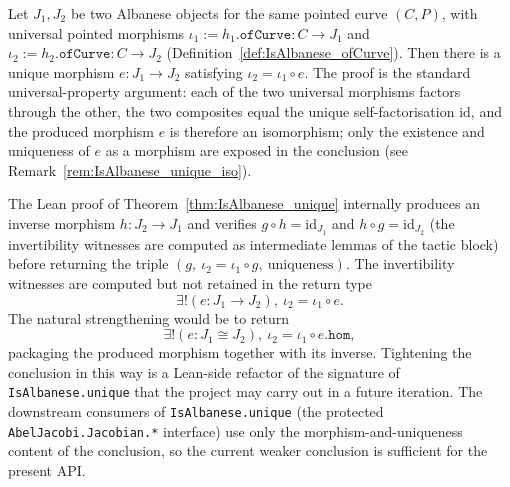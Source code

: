 \begin{theorem}
  \label{thm:IsAlbanese_unique}
  Let \(J_1, J_2\) be two Albanese objects for the same pointed curve \((C, P)\), with universal pointed morphisms \(\iota_1 := h_1.\mathtt{ofCurve} \colon C \to J_1\) and \(\iota_2 := h_2.\mathtt{ofCurve} \colon C \to J_2\) (Definition~\ref{def:IsAlbanese_ofCurve}). Then there is a unique morphism \(e \colon J_1 \to J_2\) satisfying \(\iota_2 = \iota_1 \circ e\). The proof is the standard universal-property argument: each of the two universal morphisms factors through the other, the two composites equal the unique self-factorisation \(\mathrm{id}\), and the produced morphism \(e\) is therefore an isomorphism; only the existence and uniqueness of \(e\) as a morphism are exposed in the conclusion (see Remark~\ref{rem:IsAlbanese_unique_iso}).
\end{theorem}
\begin{remark}
  \label{rem:IsAlbanese_unique_iso}
  The Lean proof of Theorem~\ref{thm:IsAlbanese_unique} internally produces an inverse morphism \(h \colon J_2 \to J_1\) and verifies \(g \circ h = \mathrm{id}_{J_1}\) and \(h \circ g = \mathrm{id}_{J_2}\) (the invertibility witnesses are computed as intermediate lemmas of the tactic block) before returning the triple \((g,\ \iota_2 = \iota_1 \circ g,\ \text{uniqueness})\). The invertibility witnesses are computed but not retained in the return type
  \[
    \exists! (e : J_1 \to J_2),\ \iota_2 = \iota_1 \circ e.
  \]
  The natural strengthening would be to return
  \[
    \exists! (e : J_1 \cong J_2),\ \iota_2 = \iota_1 \circ e.\mathtt{hom},
  \]
  packaging the produced morphism together with its inverse. Tightening the conclusion in this way is a Lean-side refactor of the signature of \texttt{IsAlbanese.unique} that the project may carry out in a future iteration. The downstream consumers of \texttt{IsAlbanese.unique} (the protected \texttt{AbelJacobi.Jacobian.*} interface) use only the morphism-and-uniqueness content of the conclusion, so the current weaker conclusion is sufficient for the present API.
\end{remark}
